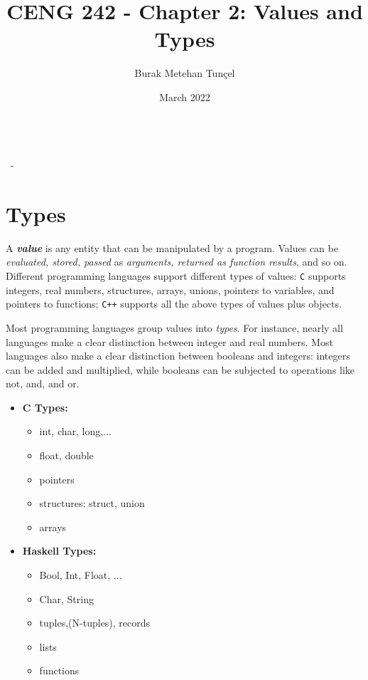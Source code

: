 \documentclass{article}
\title{CENG 242 - Chapter 2: Values and Types}
\author{Burak Metehan Tunçel}
\date{March 2022}
\makeatletter
\renewcommand\maketitle{
{\raggedright %
\begin{center}
{\Large \bfseries \@title}\\[2ex] 
{\large \@author \ - \@date}\\[2ex]
\end{center}}} %
\makeatother
\begin{document}
\maketitle

\section{Types}

A \textbf{\textit{value}} is any entity that can be manipulated by a program. Values can be \textit{evaluated, stored, passed} as \textit{arguments, returned as function results}, and so on. Different programming languages support different types of values: \texttt{C} supports integers, real numbers, structures, arrays, unions, pointers to variables, and pointers to functions; \texttt{C++} supports all the above types of values plus objects. 

Most programming languages group values into \textit{types}. For instance, nearly all languages make a clear distinction between integer and real numbers. Most languages also make a clear distinction between booleans and integers: integers can be added and multiplied, while booleans can be subjected to operations like not, and, and or.

\begin{multicols}{2}
\begin{itemize}
    \item \textbf{C Types:}
        \begin{itemize}
            \item int, char, long,...
            \item float, double
            \item pointers
            \item structures: struct, union
             \item arrays
        \end{itemize}
    
    \vfill\null
    \columnbreak
    
    \item \textbf{Haskell Types:}
        \begin{itemize}
            \item Bool, Int, Float, ...
            \item Char, String
            \item tuples,(N-tuples), records
            \item lists
            \item functions
        \end{itemize}
\end{itemize}
\end{multicols}
\end{document}
